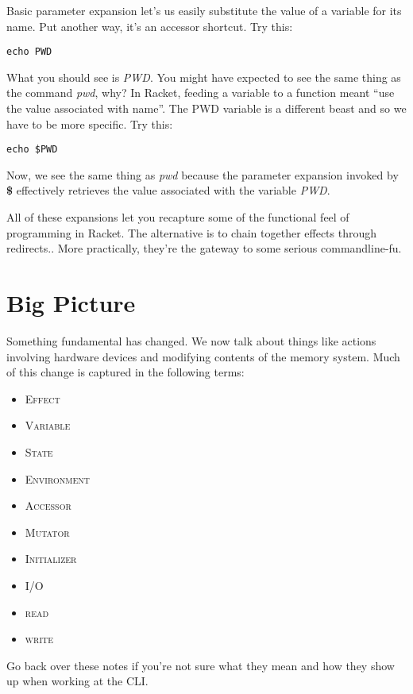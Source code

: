 \documentclass[]{tufte-handout}
\begin{document}
Basic parameter expansion let's us easily substitute the value of a variable for its name. Put another way, it's an accessor shortcut. Try this:
\begin{verbatim}
echo PWD
\end{verbatim}
What you should see is \textit{PWD}.  You might have expected to see the same thing as the command \textit{pwd}, why? In Racket, feeding a variable to a function meant ``use the value associated with name''.  The PWD variable is a different beast and so we have to be more specific. Try this:
\begin{verbatim}
echo $PWD
\end{verbatim}
Now, we see the same thing as \textit{pwd} because the parameter expansion invoked by \textbf{\$} effectively retrieves the value associated with the variable \textit{PWD}. 

All of these expansions let you recapture some of the functional feel of programming in Racket.  The alternative is to chain together effects through redirects..  More practically, they're the gateway to some serious commandline-fu. 

\section{Big Picture}

Something fundamental has changed. We now talk about things like actions involving hardware devices and modifying contents of the memory system. Much of this change is captured in the following terms: 
\begin{itemize}
\item \textsc{Effect}
\item \textsc{Variable}
\item \textsc{State}
\item \textsc{Environment}
\item \textsc{Accessor}
\item \textsc{Mutator}
\item \textsc{Initializer}
\item \textsc{I/O}
\item \textsc{read}
\item \textsc{write}
\end{itemize}
Go back over these notes if you're not sure what they mean and how they show up when working at the CLI.
\end{document}
